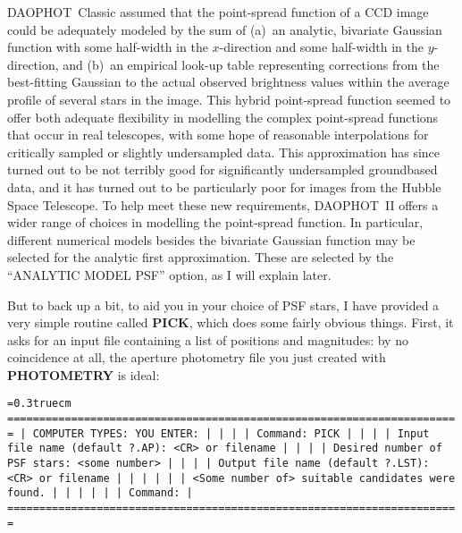 DAOPHOT~Classic assumed that the point-spread function of a CCD image
could be adequately modeled by the sum of (a)~an analytic, bivariate
Gaussian function with some half-width in the $x$-direction and some
half-width in the $y$-direction, and (b)~an empirical look-up table
representing corrections from the best-fitting Gaussian to the actual
observed brightness values within the average profile of several stars
in the image.  This hybrid point-spread function seemed to offer both
adequate flexibility in modelling the complex point-spread functions
that occur in real telescopes, with some hope of reasonable
interpolations for critically sampled or slightly undersampled data.
This approximation has since turned out to be not terribly good for
significantly undersampled groundbased data, and it has turned out to
be particularly poor for images from the Hubble Space Telescope.  To
help meet these new requirements, DAOPHOT~II offers a wider range of
choices in modelling the point-spread function.  In particular,
different numerical models besides the bivariate Gaussian function may
be selected for the analytic first approximation.  These are selected
by the ``ANALYTIC MODEL PSF'' option, as I will explain later.

But to back up a bit, to aid you in your choice of PSF stars, I have
provided a very simple routine called {\bf PICK}, which does some
fairly obvious things.  First, it asks for an input file containing a
list of positions and magnitudes:  by no coincidence at all, the
aperture photometry file you just created with {\bf PHOTOMETRY} is
ideal:

\bigskip
{\noindent\obeylines\obeyspaces\frenchspacing\tt\baselineskip=0.3truecm
=======================================================================
| COMPUTER TYPES:                                  YOU ENTER:         |
|                                                                     |
| Command:                                         PICK               |
|                                                                     |
|             Input file name (default ?.AP):      <CR> or filename   |
|                                                                     |
|                Desired number of PSF stars:      <some number>      |
|                                                                     |
|           Output file name (default ?.LST):      <CR> or filename   |
|                                                                     |
|                                                                     |
|  <Some number of> suitable candidates were found.                   |
|                                                                     |
|                                                                     |
| Command:                                                            |
=======================================================================
}
\bigskip

